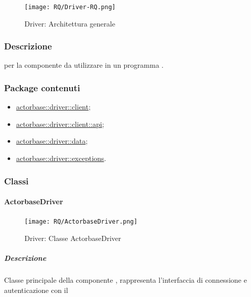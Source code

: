 \documentclass{scalatekids-article}
\begin{document}
\begin{figure}[H]
  \begin{center}
    \texttt{[image: RQ/Driver-RQ.png]}
    \caption{Driver: Architettura generale}
  \end{center}
\end{figure}

\subsubsection{Descrizione}

 per la componente  da utilizzare in un programma
.

\subsubsection{Package contenuti}

\begin{itemize}
\item \hyperref[sec:actorbase::driver::client]{actorbase::driver::client};
\item \hyperref[sec:actorbase::driver::client::api]{actorbase::driver::client::api};
\item \hyperref[sec:actorbase::driver::data]{actorbase::driver::data};
\item \hyperref[sec:actorbase::driver::exceptions]{actorbase::driver::exceptions}.
\end{itemize}

\subsubsection{Classi}

\paragraph{ActorbaseDriver}
\label{sec:actorbase::driver::ActorbaseDriver}

\begin{figure}[H]
  \begin{center}
    \texttt{[image: RQ/ActorbaseDriver.png]}
    \caption{Driver: Classe ActorbaseDriver}
  \end{center}
\end{figure}

\subparagraph{Descrizione}

Classe principale della componente , rappresenta l'interfaccia
di connessione e autenticazione con il 
\end{document}
